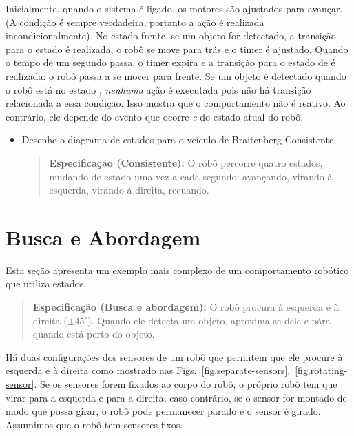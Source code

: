Inicialmente, quando o sistema é ligado, os motores são ajustados para avançar. (A condição  é sempre verdadeira, portanto a ação é realizada incondicionalmente). No estado {frente}, se um objeto for detectado,
 a transição para o estado  é realizada, o robô se move para trás e o timer é ajustado. Quando o tempo de um segundo passa, o timer expira e a transição para o estado de  é realizada: o robô passa a se mover para frente. Se um objeto é detectado quando o robô está no estado , \emph{nenhuma} ação é executada pois não há transição relacionada a essa condição. Isso mostra que o comportamento não é reativo. Ao contrário, ele depende do evento que ocorre \emph{e} do estado atual do robô.

\begin{framed}
\begin{itemize}
\item Desenhe o diagrama de estados para o veículo de Braitenberg Consistente.
\begin{quote}
\normalsize\noindent\textbf{Especificação (Consistente):} O robô percorre quatro estados, mudando de estado uma vez a cada segundo: avançando, virando à esquerda, virando à direita, recuando.
\end{quote}
\end{itemize}
\end{framed}

\section{Busca e Abordagem}\label{s.search-and-approach}

Esta seção apresenta um exemplo mais complexo de um comportamento robótico que utiliza estados.

\begin{quote}
\normalsize\noindent\textbf{Especificação (Busca e abordagem):} O robô procura à esquerda e à direita ($\pm 45^{\circ}$). Quando ele detecta um objeto, aproxima-se dele e pára quando está perto do objeto.
\end{quote}

Há duas configurações dos sensores de um robô que permitem que ele procure à esquerda e à direita como mostrado nas Figs.~\ref{fig.separate-sensors},~\ref{fig.rotating-sensor}. Se os sensores forem fixados ao corpo do robô, o próprio robô tem que virar para a esquerda e para a direita; caso contrário, se o sensor for montado de modo que possa girar, o robô pode permanecer parado e o sensor é girado. Assumimos que o robô tem sensores fixos.

